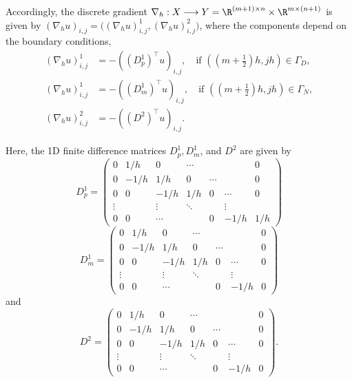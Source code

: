 \documentclass[final,reqno]{amsart}
\theoremstyle{plain}
\theoremstyle{definition}
\theoremstyle{remark}
\numberwithin{remark}{section}	%
\numberwithin{example}{section}	%
\begin{document}
Accordingly, the discrete gradient $\nabla_h: X \longrightarrow Y=\R^{(m+1)\times n} \times \R^{m\times (n+1)}$ is given by $(\nabla_h u)_{i,j} = \Big((\nabla_h u)^{1}_{i,j},(\nabla_h u)^{2}_{i,j}\Big)$, where the components depend on the boundary conditions,
\begin{equation}
    \label{eq:grad_h2}
    \begin{aligned}
        (\nabla_{h}u)^1_{i,j} &= -\left((D^1_p)^\top u\right)_{i,j}, \quad \text{if } ((m+\textstyle{\frac{1}{2}})h, j h) \in \Gamma_D,\\
        (\nabla_{h}u)^1_{i,j} &= -\left((D^1_m)^\top u\right)_{i,j}, \quad \text{if } ((m+\textstyle{\frac{1}{2}})h, j h) \in \Gamma_N,\\
        (\nabla_{h}u)^2_{i,j} &= -\left((D^2)^\top u\right)_{i,j}.
    \end{aligned}
\end{equation}

Here, the 1D finite difference matrices $D^{1}_{p}, D^{1}_{m}$, and $D^{2}$ are given by
{\footnotesize
\[
D^{1}_{p}= \begin{pmatrix}
        0 & 1/h & 0 &\cdots &&  & 0 \\
        0 & - 1/h &  1/h & 0 &\cdots&   & 0 \\
        0 & 0 & - 1/h &  1/h & 0 &\cdots & 0 \\
        \vdots &&  \vdots & \ddots &&  \vdots \\
        0 & 0 & \cdots & & 0 & - 1/h &  1/h
\end{pmatrix}
\]
\[
D^1_m= \begin{pmatrix}
        0 & 1/h & 0 &\cdots &&  & 0 \\
        0 & - 1/h &  1/h & 0 &\cdots&   & 0 \\
        0 & 0 & - 1/h &  1/h & 0 &\cdots & 0 \\
        \vdots &&  \vdots & \ddots &&  \vdots \\
        0 & 0 & \cdots & & 0 & - 1/h &  0
\end{pmatrix}
\]
and
\[
D^2= \begin{pmatrix}
        0 & 1/h & 0 &\cdots &&  & 0 \\
        0 & - 1/h &  1/h & 0 &\cdots&   & 0 \\
        0 & 0 & - 1/h &  1/h & 0 &\cdots & 0 \\
        \vdots &&  \vdots & \ddots &&  \vdots \\
        0 & 0 & \cdots & & 0 & - 1/h &  0
\end{pmatrix}.
\]
} 
\end{document}
